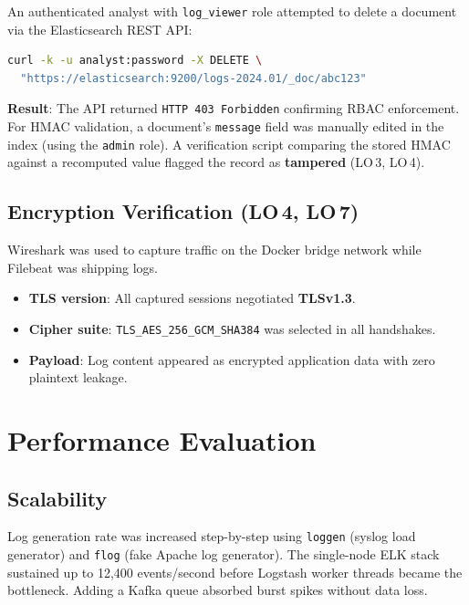 \documentclass[12pt,a4paper]{report}
\begin{document}
An authenticated analyst with \texttt{log\_viewer} role attempted to
delete a document via the Elasticsearch REST API:

\begin{lstlisting}[language=bash, caption={Unauthorized delete attempt}]
curl -k -u analyst:password -X DELETE \
  "https://elasticsearch:9200/logs-2024.01/_doc/abc123"
\end{lstlisting}

\textbf{Result}: The API returned \texttt{HTTP 403 Forbidden} confirming RBAC
enforcement.
For HMAC validation, a document's \texttt{message} field was manually edited in
the index (using the \texttt{admin} role).
A verification script comparing the stored HMAC against a recomputed value
flagged the record as \textbf{tampered} (LO\,3, LO\,4).

\subsection{Encryption Verification (LO\,4, LO\,7)}

Wireshark was used to capture traffic on the Docker bridge network while Filebeat
was shipping logs.

\begin{itemize}[leftmargin=1.5em]
    \item \textbf{TLS version}: All captured sessions negotiated \textbf{TLSv1.3}.
    \item \textbf{Cipher suite}: \texttt{TLS\_AES\_256\_GCM\_SHA384} was selected
          in all handshakes.
    \item \textbf{Payload}: Log content appeared as encrypted application data
          with zero plaintext leakage.
\end{itemize}

\section{Performance Evaluation}

\subsection{Scalability}

Log generation rate was increased step-by-step using \texttt{loggen} (syslog load
generator) and \texttt{flog} (fake Apache log generator).
The single-node ELK stack sustained up to 12,400 events/second before Logstash
worker threads became the bottleneck.
Adding a Kafka queue absorbed burst spikes without data loss.
\end{document}
